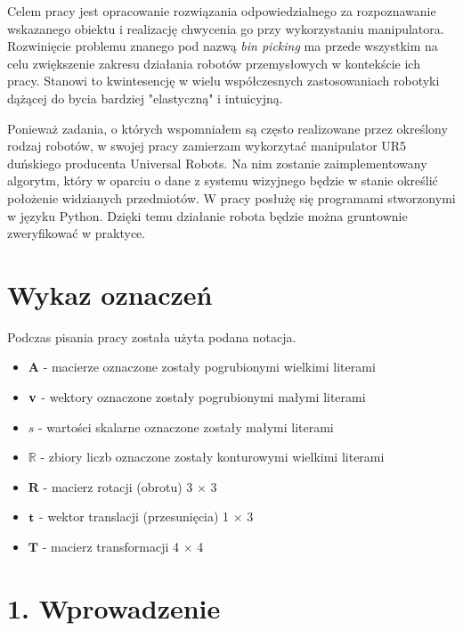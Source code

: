 \documentclass{article}
\begin{document}
Celem pracy jest opracowanie rozwiązania odpowiedzialnego za rozpoznawanie wskazanego obiektu i realizację chwycenia go przy wykorzystaniu manipulatora. Rozwinięcie problemu znanego pod nazwą \emph{bin picking} ma przede wszystkim na celu zwiększenie zakresu działania robotów przemysłowych w kontekście ich pracy. Stanowi to kwintesencję w wielu współczesnych zastosowaniach robotyki dążącej do bycia bardziej "elastyczną" i intuicyjną.

Ponieważ zadania, o których wspomniałem są często realizowane przez określony rodzaj robotów, w swojej pracy zamierzam wykorzytać manipulator UR5 duńskiego producenta Universal Robots. Na nim zostanie zaimplementowany algorytm, który w oparciu o dane z systemu wizyjnego będzie w stanie określić położenie widzianych przedmiotów. W pracy posłużę się programami stworzonymi w języku Python. Dzięki temu działanie robota będzie można gruntownie zweryfikować w praktyce.

\newpage
\tableofcontents

\newpage
\section*{\LARGE{Wykaz oznaczeń}}
Podczas pisania pracy została użyta podana notacja.
\begin{itemize}
\item $\mathbf{A}$ - macierze oznaczone zostały pogrubionymi wielkimi literami
\item $\vb{v}$ - wektory oznaczone zostały pogrubionymi małymi literami
\item $s$ - wartości skalarne oznaczone zostały małymi literami
\item $\mathbb{R}$ - zbiory liczb oznaczone zostały konturowymi wielkimi literami
\item $\mathbf{R}$ - macierz rotacji (obrotu) 3 $\times$ 3
\item $\vb{t}$ - wektor translacji (przesunięcia) 1 $\times$ 3
\item $\mathbf{T}$ - macierz transformacji 4 $\times$ 4
\end{itemize}

\newpage
\section*{\LARGE{1. Wprowadzenie}} 
\end{document}
